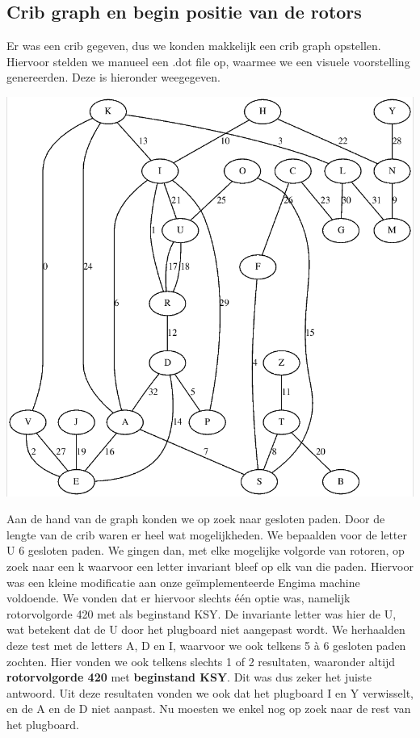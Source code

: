 \subsection{Crib graph en begin positie van de rotors}
Er was een crib gegeven, dus we konden makkelijk een crib graph opstellen. Hiervoor stelden we manueel een .dot file op, waarmee we een visuele voorstelling genereerden. Deze is hieronder weegegeven. \\
\begin{center}
\includegraphics[scale=0.25]{enigma/graph.png}
\end{center}
Aan de hand van de graph konden we op zoek naar gesloten paden. Door de lengte van de crib waren er heel wat mogelijkheden. We bepaalden voor de letter U 6 gesloten paden. We gingen dan, met elke mogelijke volgorde van rotoren, op zoek naar een k waarvoor een letter invariant bleef op elk van die paden. Hiervoor was een kleine modificatie aan onze ge\"implementeerde Engima machine voldoende. We vonden dat er hiervoor slechts \'e\'en optie was, namelijk rotorvolgorde 420 met als beginstand KSY. De invariante letter was hier de U, wat betekent dat de U door het plugboard niet aangepast wordt. We herhaalden deze test met de letters A, D en I, waarvoor we ook telkens 5 \`a 6 gesloten paden zochten. Hier vonden we ook telkens slechts 1 of 2 resultaten, waaronder altijd \textbf{rotorvolgorde 420} met \textbf{beginstand KSY}. Dit was dus zeker het juiste antwoord. Uit deze resultaten vonden we ook dat het plugboard I en Y verwisselt, en de A en de D niet aanpast. Nu moesten we enkel nog op zoek naar de rest van het plugboard.

